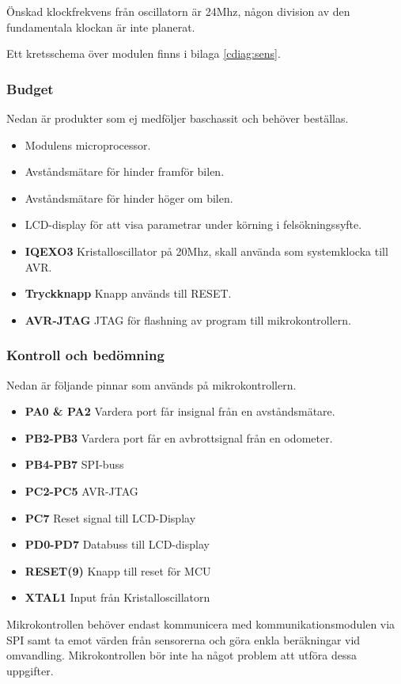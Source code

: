\documentclass[designspec/spec.tex]{subfiles}
\begin{document}
Önskad klockfrekvens från oscillatorn är 24Mhz, någon division av den
fundamentala klockan är inte planerat.

Ett kretsschema över modulen finns i bilaga \ref{cdiag:sens}.

\subsubsection{Budget}
Nedan är produkter som ej medföljer baschassit och behöver beställas.
\begin{itemize}
	\item \textbf{\modMicrocontroller} Modulens microprocessor. 
    \item \textbf{\modDistf} Avståndsmätare för hinder framför bilen.
    \item \textbf{\modDists} Avståndsmätare för hinder höger om bilen.
    \item \textbf{\modLcd} LCD-display för att visa parametrar under körning
    i felsökningssyfte.
    \item \textbf{IQEXO3} Kristalloscillator på 20Mhz, skall använda som systemklocka till AVR.
    \item \textbf{Tryckknapp} Knapp används till RESET.
    \item \textbf{AVR-JTAG} JTAG för flashning av program till mikrokontrollern.
\end{itemize}

\subsubsection{Kontroll och bedömning}
Nedan är följande pinnar som används på mikrokontrollern.
\begin{itemize}
   \item \textbf{PA0 \& PA2} Vardera port får insignal från en avståndsmätare.
   \item \textbf{PB2-PB3} Vardera port får en avbrottsignal från en odometer.
   \item \textbf{PB4-PB7} SPI-buss
   \item \textbf{PC2-PC5} AVR-JTAG
   \item \textbf{PC7} Reset signal till LCD-Display
   \item \textbf{PD0-PD7} Databuss till LCD-display
   \item \textbf{RESET(9)} Knapp till reset för MCU
   \item \textbf{XTAL1} Input från Kristalloscillatorn
\end{itemize}
Mikrokontrollen behöver endast kommunicera med kommunikationsmodulen via SPI
samt ta emot värden från sensorerna och göra enkla beräkningar vid omvandling.
Mikrokontrollen bör inte ha något problem att utföra dessa uppgifter.
\end{document}
